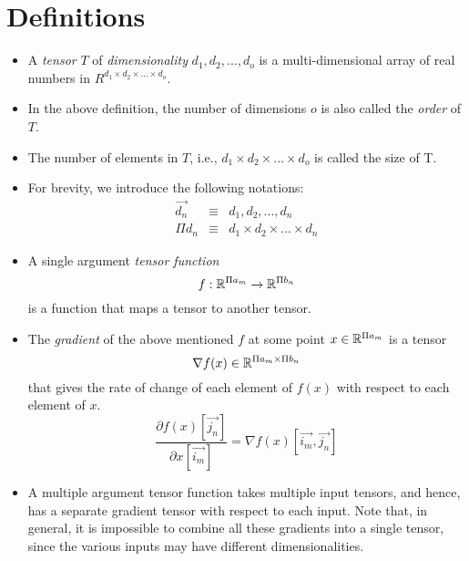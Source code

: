 \documentclass{article}
\begin{document}
\section{Definitions}
  \begin{itemize}
  
  \item
  A \emph{tensor} $T$ of \emph{dimensionality} $d_1, d_2, ..., d_o$ is
  a multi-dimensional array of real numbers in
  $R^{d_1 \times d_2 \times ... \times d_o}$.
  
  \item
  In the above definition,
  the number of dimensions $o$ is also called
  the \emph{order} of $T$.
  
  \item
  The number of elements in $T$, i.e.,
  $d_1 \times d_2 \times ... \times d_o$
  is called the size of T.
  
  \item
  For brevity, we introduce the following notations:
  \begin{eqnarray*}
    \overrightarrow{d_n} & \equiv & d_1, d_2, ..., d_n \\
    \Pi d_n              & \equiv & d_1 \times d_2 \times ... \times d_n 
  \end{eqnarray*}
  
  \item
  A single argument \emph{tensor function} 
  \[f: \mathbb{R}^{\Pi a_m} 
       \rightarrow 
       \mathbb{R}^{\Pi b_n}
  \]
  is a function that maps a tensor to another tensor.
  
  \item
  The \emph{gradient} of the above mentioned $f$
  at some point $x \in \mathbb{R}^{\Pi a_m}$
  is a tensor 
  \[\nabla f(x) \in \mathbb{R}^{\Pi a_m \times \Pi b_n} 
  \]
  that gives the rate of change of each element of $f(x)$
  with respect to each element of $x$.
  \[ \frac{\partial f(x)[\overrightarrow{j_n}]}
          {\partial x[\overrightarrow{i_m}]}
     = \nabla f(x)[\overrightarrow{i_m}, \overrightarrow{j_n}]
  \]
  
  \item
  A multiple argument tensor function
  takes multiple input tensors, and hence, 
  has a separate gradient tensor with respect to each input.
  Note that, in general,
  it is impossible to combine all these gradients into a single tensor,
  since the various inputs may have different dimensionalities.
  
  \end{itemize}
\end{document}
